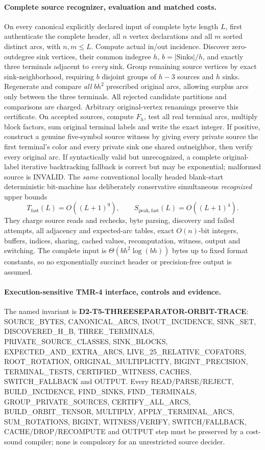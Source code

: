 \documentclass[11pt]{article}
\begin{document}
\paragraph{Complete source recognizer, evaluation and matched costs.}
On every canonical explicitly declared input of complete byte length
$L$, first authenticate the complete header, all $n$ vertex
declarations and all $m$ sorted distinct arcs, with $n,m\le L$.
Compute actual in/out incidence. Discover zero-outdegree sink
vertices, their common indegree $h$, $b=|\mathrm{Sinks}|/h$,
and exactly three terminals adjacent to \emph{every} sink.
Group remaining source vertices by exact sink-neighborhood,
requiring $b$ disjoint groups of $h-3$ sources and $h$ sinks.
Regenerate and compare \emph{all} $bh^2$ prescribed original arcs,
allowing surplus arcs only between the three terminals.
All rejected candidate partitions and comparisons are charged.
Arbitrary original-vertex renamings preserve this certificate.
On accepted sources, compute $F_h$, test all real terminal
arcs, multiply block factors, sum original terminal labels
and write the exact integer. If positive, construct a genuine
five-symbol source witness by giving every private source the
first terminal's color and every private sink one shared
outneighbor, then verify every original arc. If syntactically
valid but unrecognized, a complete original-label iterative
backtracking fallback is correct but may be exponential;
malformed source is INVALID. The \emph{same} conventional
locally headed blank-start deterministic bit-machine has
deliberately conservative simultaneous \emph{recognized}
upper bounds
\[
T_{\mathrm{fast}}(L)=O((L+1)^9),\qquad
S_{\mathrm{peak,fast}}(L)=O((L+1)^4).
\]
They charge source reads and rechecks, byte parsing, discovery
and failed attempts, all adjacency and expected-arc tables,
exact $O(n)$-bit integers, buffers, indices, sharing,
cached values, recomputation, witness, output and switching.
The complete input is $\Theta(bh^2\log(bh))$ bytes up to fixed
format constants, so no exponentially succinct header
or precision-free output is assumed.

\paragraph{Execution-sensitive TMR-4 interface, controls and evidence.}
The named invariant is
\textbf{D2-T5-THREESEPARATOR-ORBIT-TRACE}: SOURCE_BYTES,
CANONICAL_ARCS, INOUT_INCIDENCE, SINK_SET, DISCOVERED_H_B,
THREE_TERMINALS, PRIVATE_SOURCE_CLASSES, SINK_BLOCKS,
EXPECTED_AND_EXTRA_ARCS, LIVE_25_RELATIVE_COFATORS,
ROOT_ROTATION, ORIGINAL_MULTIPLICITY, BIGINT_PRECISION,
TERMINAL_TESTS, CERTIFIED_WITNESS, CACHES, SWITCH_FALLBACK
and OUTPUT. Every READ/PARSE/REJECT, BUILD_INCIDENCE,
FIND_SINKS, FIND_TERMINALS, GROUP_PRIVATE_SOURCES,
CERTIFY_ALL_ARCS, BUILD_ORBIT_TENSOR, MULTIPLY,
APPLY_TERMINAL_ARCS, SUM_ROTATIONS, BIGINT,
WITNESS/VERIFY, SWITCH/FALLBACK, CACHE/DROP/RECOMPUTE
and OUTPUT step must be preserved by a cost-sound compiler;
none is compulsory for an unrestricted source decider.
\end{document}

